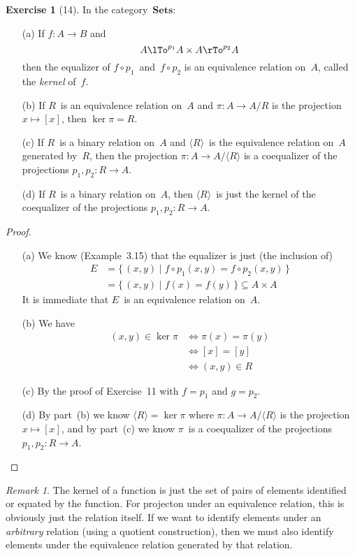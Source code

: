 \documentclass[letterpaper,12pt]{article}
\newcommand{\after}{\circ}
\newcommand{\cat}[1]{\mathbf{#1}}
\newcommand{\gen}[1]{\langle{#1}\rangle}
\newcommand{\2}{\cat{2}}
\newcommand{\Sets}{\cat{Sets}}
\theoremstyle{definition}
\newtheorem*{exer}{Exercise}
\theoremstyle{remark}
\newtheorem*{rmk}{Remark}
\theoremstyle{direction}
\begin{document}
\begin{exer}[14]
In the category~\(\Sets\):
\begin{enumerate}[itemsep=0pt]
\item[(a)] If \(f:A\to B\) and
\[A\lTo^{p_1}A\times A\rTo^{p_2}A\]
then the equalizer of \(f\after p_1\)~and~\(f\after p_2\) is an equivalence relation on~\(A\), called the \emph{kernel} of~\(f\).
\item[(b)] If \(R\)~is an equivalence relation on~\(A\) and \(\pi:A\to A/R\) is the projection \(x\mapsto[x]\), then \(\ker\pi=R\).
\item[(c)] If \(R\)~is a binary relation on~\(A\) and \(\gen{R}\)~is the equivalence relation on~\(A\) generated by~\(R\), then the projection \(\pi:A\to A/\gen{R}\) is a coequalizer of the projections \(p_1,p_2:R\to A\).
\item[(d)] If \(R\)~is a binary relation on~\(A\), then \(\gen{R}\)~is just the kernel of the coequalizer of the projections \(p_1,p_2:R\to A\).
\end{enumerate}
\end{exer}
\begin{proof}\
\begin{enumerate}[itemsep=0pt]
\item[(a)] We know (Example~3.15) that the equalizer is just (the inclusion of)
\begin{align*}
E&=\{\,(x,y)\mid f\after p_1(x,y)=f\after p_2(x,y)\,\}\\
	&=\{\,(x,y)\mid f(x)=f(y)\,\}\subseteq A\times A
\end{align*}
It is immediate that \(E\)~is an equivalence relation on~\(A\).
\item[(b)] We have
\begin{align*}
(x,y)\in\ker\pi&\iff\pi(x)=\pi(y)\\
	&\iff[x]=[y]\\
	&\iff(x,y)\in R
\end{align*}
\item[(c)] By the proof of Exercise~11 with \(f=p_1\) and \(g=p_2\).
\item[(d)] By part~(b) we know \(\gen{R}=\ker\pi\) where \(\pi:A\to A/\gen{R}\) is the projection \(x\mapsto[x]\), and by part~(c) we know \(\pi\)~is a coequalizer of the projections \(p_1,p_2:R\to A\).\qedhere
\end{enumerate}
\end{proof}
\begin{rmk}
The kernel of a function is just the set of pairs of elements identified or equated by the function. For projecton under an equivalence relation, this is obviously just the relation itself. If we want to identify elements under an \emph{arbitrary} relation (using a quotient construction), then we must also identify elements under the equivalence relation generated by that relation.
\end{rmk}
\end{document}
